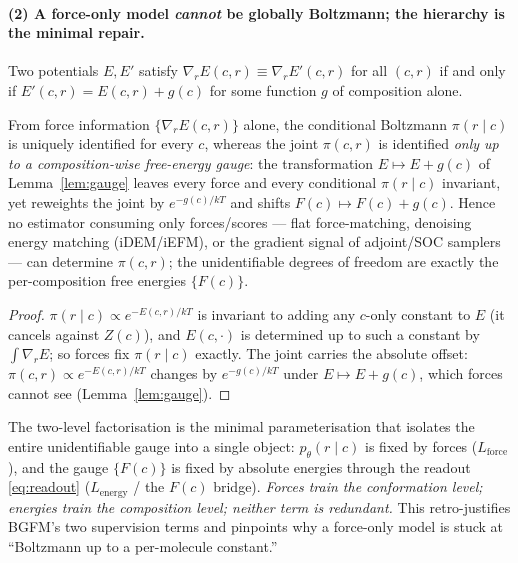 \paragraph{(2) A force-only model \emph{cannot} be globally Boltzmann; the hierarchy is the minimal repair.}
\begin{lemma}
\label{lem:gauge}
Two potentials $E,E'$ satisfy $\nabla_r E(c,r)\equiv\nabla_r E'(c,r)$ for all $(c,r)$ if and
only if $E'(c,r)=E(c,r)+g(c)$ for some function $g$ of composition alone.
\end{lemma}
\begin{theorem}
\label{thm:gauge}
From force information $\{\nabla_r E(c,r)\}$ alone, the conditional Boltzmann
$\pi(r\mid c)$ is uniquely identified for every $c$, whereas the joint $\pi(c,r)$ is
identified \emph{only up to a composition-wise free-energy gauge}: the transformation
$E\mapsto E+g(c)$ of Lemma~\ref{lem:gauge} leaves every force and every conditional
$\pi(r\mid c)$ invariant, yet reweights the joint by $e^{-g(c)/kT}$ and shifts
$F(c)\mapsto F(c)+g(c)$. Hence no estimator consuming only forces/scores --- flat
force-matching, denoising energy matching (iDEM/iEFM), or the gradient signal of
adjoint/SOC samplers --- can determine $\pi(c,r)$; the unidentifiable degrees of freedom
are exactly the per-composition free energies $\{F(c)\}$.
\end{theorem}
\begin{proof}
$\pi(r\mid c)\propto e^{-E(c,r)/kT}$ is invariant to adding any $c$-only constant to $E$
(it cancels against $Z(c)$), and $E(c,\cdot)$ is determined up to such a constant by
$\int\nabla_r E$; so forces fix $\pi(r\mid c)$ exactly. The joint carries the absolute
offset: $\pi(c,r)\propto e^{-E(c,r)/kT}$ changes by $e^{-g(c)/kT}$ under $E\mapsto E+g(c)$,
which forces cannot see (Lemma~\ref{lem:gauge}).
\end{proof}
\begin{corollary}
\label{cor:labor}
The two-level factorisation is the minimal parameterisation that isolates the entire
unidentifiable gauge into a single object: $p_\theta(r\mid c)$ is fixed by forces
($L_{\mathrm{force}}$), and the gauge $\{F(c)\}$ is fixed by absolute energies through the
readout \eqref{eq:readout} ($L_{\mathrm{energy}}$ / the $F(c)$ bridge). \emph{Forces train
the conformation level; energies train the composition level; neither term is redundant.}
This retro-justifies BGFM's two supervision terms and pinpoints why a force-only model
is stuck at ``Boltzmann up to a per-molecule constant.''
\end{corollary}

